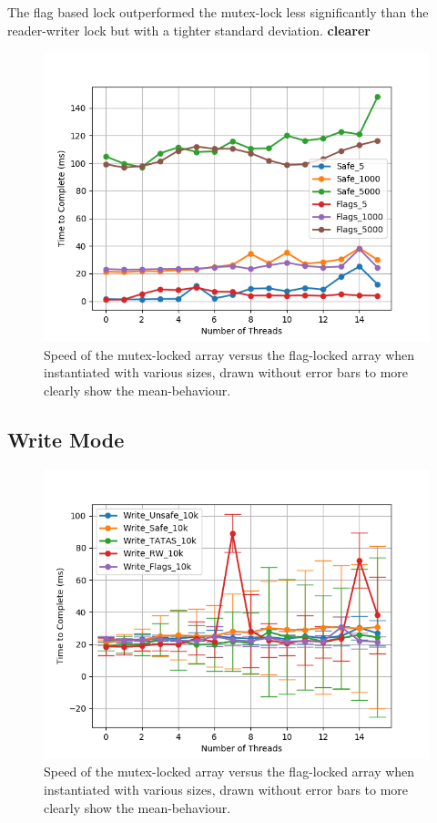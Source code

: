 \documentclass[11pt]{article}
\newcommand{\todo}[1]{\textbf{#1}}
\begin{document}
The flag based lock outperformed the mutex-lock less significantly than the reader-writer lock but with a tighter standard deviation. \todo{clearer}

\begin{figure}\label{fig:step6_2}
\centering
\includegraphics[scale=0.65]{step6_2.png}
\caption{Speed of the mutex-locked array versus the flag-locked array when instantiated with various sizes, drawn without error bars to more clearly show the mean-behaviour.}
\end{figure}

\subsection{Write Mode}

\begin{figure}\label{fig:step7_1}
\centering
\includegraphics[scale=0.65]{step7_1.png}
\caption{Speed of the mutex-locked array versus the flag-locked array when instantiated with various sizes, drawn without error bars to more clearly show the mean-behaviour.}
\end{figure}
\end{document}

